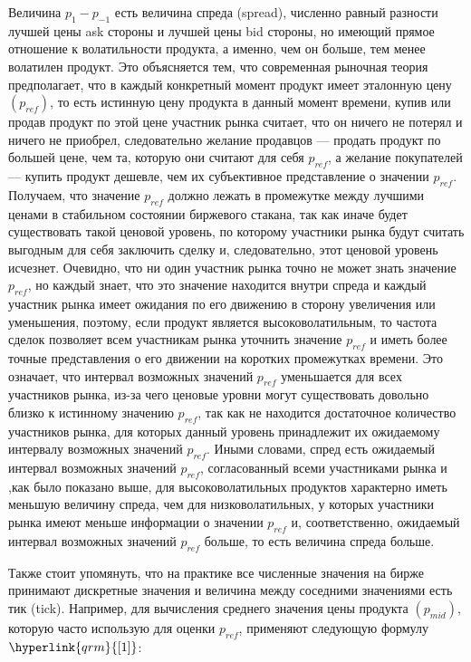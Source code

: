 \documentclass[12pt, a4paper]{article}
\begin{document}
Величина $p_1 - p_{-1}$ есть величина спреда (spread), численно равный разности лучшей цены ask стороны и лучшей цены bid стороны, но имеющий прямое отношение к волатильности продукта, а именно, чем он больше, тем менее волатилен продукт. Это объясняется тем, что современная рыночная теория предполагает, что в каждый конкретный момент продукт имеет эталонную цену $(p_{ref})$, то есть истинную цену продукта в данный момент времени, купив или продав продукт по этой цене участник рынка считает, что он ничего не потерял и ничего не приобрел, следовательно желание продавцов --- продать продукт по большей цене, чем та, которую они считают для себя $p_{ref}$, а желание покупателей --- купить продукт дешевле, чем их субъективное представление о значении $p_{ref}$. Получаем, что значение $p_{ref}$ должно лежать в промежутке между лучшими ценами в стабильном состоянии биржевого стакана, так как иначе будет существовать такой ценовой уровень, по которому участники рынка будут считать выгодным для себя заключить сделку и, следовательно, этот ценовой уровень исчезнет. Очевидно, что ни один участник рынка точно не может знать значение $p_{ref}$, но каждый знает, что это значение находится внутри спреда и каждый участник рынка имеет ожидания по его движению в сторону увеличения или уменьшения, поэтому, если продукт является высоковолатильным, то частота сделок позволяет всем участникам рынка уточнить значение $p_{ref}$ и иметь более точные представления о его движении на коротких промежутках времени. Это означает, что интервал возможных значений $p_{ref}$ уменьшается для всех участников рынка, из-за чего ценовые уровни могут существовать довольно близко к истинному значению $p_{ref}$, так как не находится достаточное количество участников рынка, для которых данный уровень принадлежит их ожидаемому интервалу возможных значений $p_{ref}$. Иными словами, спред есть ожидаемый интервал возможных значений $p_{ref}$, согласованный всеми участниками рынка и ,как было показано выше, для высоковолатильных продуктов характерно иметь меньшую величину спреда, чем для низковолатильных, у которых участники рынка имеют меньше информации о значении $p_{ref}$ и, соответственно, ожидаемый интервал возможных значений $p_{ref}$ больше, то есть величина спреда больше.

Также стоит упомянуть, что на практике все численные значения на бирже принимают дискретные значения и величина между соседними значениями есть тик (tick). Например, для вычисления среднего значения цены продукта $(p_{mid})$, которую часто использую для оценки $p_{ref}$, применяют следующую формулу $\hyperlink{qrm}{[1]}$:
\end{document}

